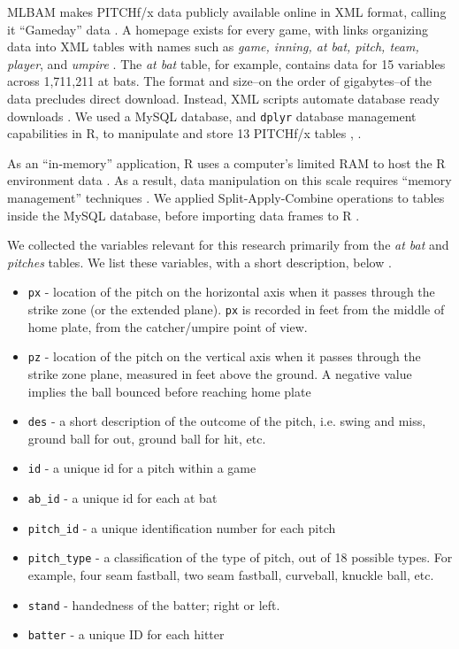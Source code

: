 MLBAM\textsuperscript{\textregistered} makes PITCHf/x\textsuperscript{\textregistered} data publicly available online in XML format, calling it ``Gameday'' data \citep{Sievert2014}. A homepage exists for every game, with links organizing data into XML tables with names such as {\it game, inning, at bat, pitch, team, player}, and {\it umpire} \citep{Sievert2014}. The {\it at bat} table, for example, contains data for 15 variables across 1,711,211 at bats. The format and size--on the order of gigabytes--of the data precludes direct download. Instead, XML scripts automate database ready downloads \citep{Adler2006}. We used a MySQL database, and \verb|dplyr| database management capabilities in R, to manipulate and store 13 PITCHf/x\textsuperscript{\textregistered} tables \citep{Tahaghoghi2006}, \citep{Wickham2016}. 

As an ``in-memory'' application, R uses a computer's limited RAM to host the R environment data \citep{Smith2013}. As a result, data manipulation on this scale requires ``memory management'' techniques \citep{Wickham2014}.  We applied Split-Apply-Combine operations to tables inside the MySQL database, before importing data frames to R \citep{Wickham2011}.

We collected the variables relevant for this research primarily from the {\it at bat} and {\it pitches} tables. We list these variables, with a short description, below \citep{Fast2007}.
  \begin{itemize}
  \item \verb|px| - location of the pitch on the horizontal axis when it passes through the strike zone (or the extended plane). \verb|px| is recorded in feet from the middle of home plate, from the catcher/umpire point of view.
  \item \verb|pz| - location of the pitch on the vertical axis when it passes through the strike zone plane, measured in feet above the ground. A negative value implies the ball bounced before reaching home plate
  \item \verb|des| - a short description of the outcome of the pitch, i.e. swing and miss, ground ball for out, ground ball for hit, etc.  
  \item \verb|id| - a unique id for a pitch within a game
  \item \verb|ab_id| - a unique id for each at bat  
  \item \verb|pitch_id| - a unique identification number for each pitch
  \item \verb|pitch_type| - a classification of the type of pitch, out of 18 possible types. For example, four seam fastball, two seam fastball, curveball, knuckle ball, etc.
  \item \verb|stand| - handedness of the batter; right or left.
  \item \verb|batter| - a unique ID for each hitter
  \end{itemize}

